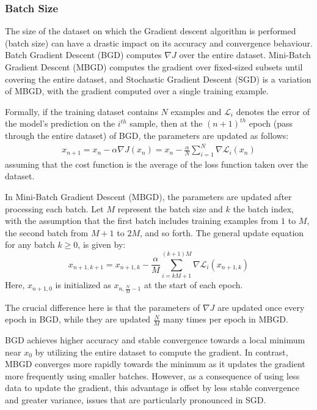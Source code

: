 


\subsubsection{Batch Size}

The size of the dataset on which the Gradient descent algorithm is performed (batch size) can have a drastic impact on its accuracy and convergence behaviour. Batch Gradient Descent (BGD) computes \( \nabla J \) over the entire dataset. Mini-Batch Gradient Descent (MBGD) computes the gradient over fixed-sized subsets until covering the entire dataset, and Stochastic Gradient Descent (SGD) is a variation of MBGD, with the gradient computed over a single training example.

Formally, if the training dataset contains $N$ examples and $\mathcal{L}_i$ denotes the error of the model's prediction on the $i^{th}$ sample, then at the $(n+1)^{th}$  epoch (pass through the entire dataset) of BGD, the parameters are updated as follows:
\begin{align*}
    x_{n+1} = x_n - \alpha \nabla J(x_n)
            = x_n - \frac{\alpha}{N}\sum_{i=1}^{N} \nabla \mathcal{L}_i(x_n)
\end{align*} 
assuming that the cost function is the average of the loss function taken over the dataset. 

In Mini-Batch Gradient Descent (MBGD), the parameters are updated after processing each batch. Let \( M \) represent the batch size and \( k \) the batch index, with the assumption that the first batch includes training examples from \( 1 \) to \( M \), the second batch from \( M+1 \) to \( 2M \), and so forth. The general update equation for any batch \( k \geq 0 \), is given by:
\[
x_{n+1,k+1} = x_{n+1,k} - \frac{\alpha}{M} \sum_{i=kM+1}^{(k+1)M} \nabla \mathcal{L}_i(x_{n+1,k})
\]
Here, \( x_{n+1,0} \) is initialized as \( x_{n,\frac{N}{M}-1} \) at the start of each epoch.
 

The crucial difference here is that the parameters of \( \nabla J \) are updated once every epoch in BGD, while they are updated $\frac{N}{M}$ many times per epoch in MBGD. 


BGD achieves higher accuracy and stable convergence towards a local minimum near \(x_0\) by utilizing the entire dataset to compute the gradient. In contrast, MBGD converges more rapidly towards the minimum as it updates the gradient more frequently using smaller batches. However, as a consequence of using less data to update the gradient, this advantage is offset by less stable convergence and greater variance, issues that are particularly pronounced in SGD.

